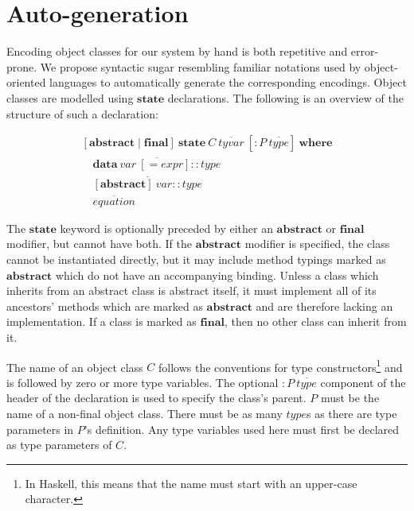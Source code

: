 \documentclass[runningheads,a4paper]{llncs}
\begin{document}
\section{Auto-generation}
\label{sec:auto}

Encoding object classes for our system by hand is both repetitive and error-prone. We propose syntactic sugar resembling familiar notations used by object-oriented languages to automatically generate the corresponding encodings. Object classes are modelled using $\mathbf{state}$ declarations. The following is an overview of the structure of such a declaration:

\begin{displaymath}
\begin{array}{l}
[\mathbf{abstract} \mid \mathbf{final}]~\mathbf{state}~\mathit{C}~\overline{\mathit{tyvar}}~[: P~\overline{\mathit{type}}]~\mathbf{where} \\
\quad \overline{\mathbf{data}~\mathit{var}~[= \mathit{expr}] :: \mathit{type}} \\
\quad \overline{[\mathbf{abstract}]~\mathit{var} :: \mathit{type}} \\
\quad \overline{\mathit{equation}}
\end{array}
\end{displaymath}

The $\mathbf{state}$ keyword is optionally preceded by either an $\mathbf{abstract}$ or $\mathbf{final}$ modifier, but cannot have both. If the $\mathbf{abstract}$ modifier is specified, the class cannot be instantiated directly, but it may include method typings marked as $\mathbf{abstract}$ which do not have an accompanying binding. Unless a class which inherits from an abstract class is abstract itself, it must implement all of its ancestors' methods which are marked as $\mathbf{abstract}$ and are therefore lacking an implementation. If a class is marked as $\mathbf{final}$, then no other class can inherit from it.

The name of an object class $C$ follows the conventions for type constructors\footnote{In Haskell, this means that the name must start with an upper-case character.} and is followed by zero or more type variables. The optional $: \mathit{P}~\overline{\mathit{type}}$ component of the header of the declaration is used to specify the class's parent. $P$ must be the name of a non-final object class. There must be as many $\mathit{type}$s as there are type parameters in $P$'s definition. Any type variables used here must first be declared as type parameters of $C$.
\end{document}
